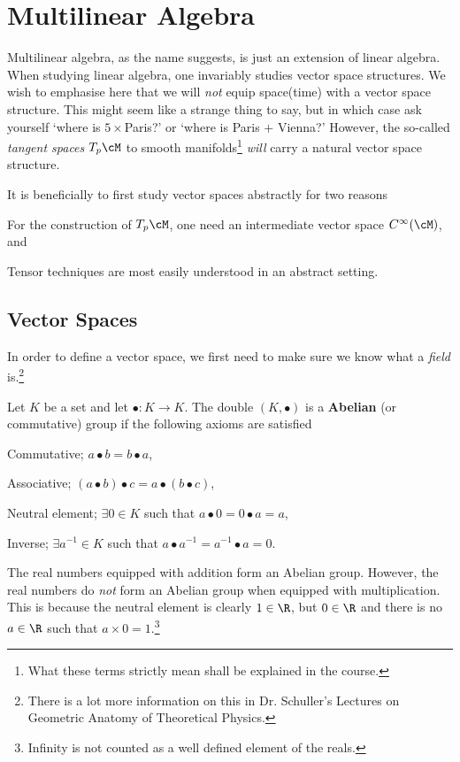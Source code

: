 \chapter{Multilinear Algebra}

Multilinear algebra, as the name suggests, is just an extension of linear algebra. When studying linear algebra, one invariably studies vector space structures. We wish to emphasise here that we will \textit{not} equip space(time) with a vector space structure. This might seem like a strange thing to say, but in which case ask yourself `where is $5\times$Paris?' or `where is Paris $+$ Vienna?' However, the so-called \textit{tangent spaces} $T_p\cM$ to smooth manifolds\footnote{What these terms strictly mean shall be explained in the course.} \textit{will} carry a natural vector space structure. 

It is beneficially to first study vector spaces abstractly for two reasons 
\benr 
    \item For the construction of $T_p\cM$, one need an intermediate vector space $C^{\infty}(\cM)$, and  
    \item Tensor techniques are most easily understood in an abstract setting. 
\een 

\section{Vector Spaces}

In order to define a vector space, we first need to make sure we know what a \textit{field} is.\footnote{There is a lot more information on this in Dr. Schuller's Lectures on Geometric Anatomy of Theoretical Physics.} 

    Let $K$ be a set and let $\bullet:K\to K$. The double $(K,\bullet)$ is a \textbf{Abelian} (or commutative) group if the following axioms are satisfied
    \benr 
        \item Commutative; $a\bullet b = b\bullet a$,
        \item Associative;  $(a\bullet b)\bullet c = a\bullet (b\bullet c)$,
        \item Neutral element; $\exists 0\in K$ such that $a\bullet 0 = 0\bullet a = a$, 
        \item Inverse; $\exists a^{-1} \in K$ such that $a\bullet a^{-1} = a^{-1}\bullet a = 0$.
    \een 
\ed 

\bex 
    The real numbers equipped with addition form an Abelian group. However, the real numbers do \textit{not} form an Abelian group when equipped with multiplication. This is because the neutral element is clearly $1\in\R$, but $0\in\R$ and there is no $a\in\R$ such that $a\times 0 =1$.\footnote{Infinity is not counted as a well defined element of the reals.} 
\eex 

